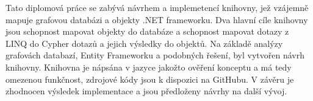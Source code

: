 Tato diplomová práce se zabývá návrhem a implemetencí knihovny, jež vzájemně mapuje grafovou databázi a objekty .NET frameworku.
Dva hlavní cíle knihovny jsou schopnost mapovat objekty do databáze a schopnost mapovat dotazy z LINQ do Cypher dotazů a jejich výsledky do objektů.
Na základě analýzy grafovách databazí, Entity Frameworku a podobných řešení, byl vytvořen návrh knihovny.
Knihovna je nápsána v jazyce \CS jakožto ověření konceptu a má tedy omezenou funkčnost, zdrojové kódy jsou k dispozici na GitHubu.
V závěru je zhodnocen výsledek implementace a jsou předloženy návrhy na další vývoj.
